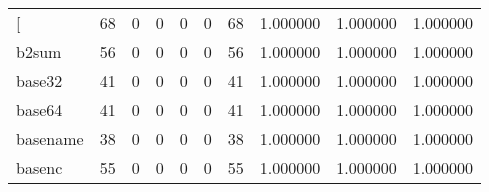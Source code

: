 \begin{longtable}{lrrrrrrrrr}
\bottomrule
\endlastfoot
{[}         &                                        68 &                                                  0 &                                                  0 &                                                  0 &                                                  0 &                                                 68 &                                           1.000000 &                               1.000000 &                             1.000000 \\
b2sum     &                                        56 &                                                  0 &                                                  0 &                                                  0 &                                                  0 &                                                 56 &                                           1.000000 &                               1.000000 &                             1.000000 \\
base32    &                                        41 &                                                  0 &                                                  0 &                                                  0 &                                                  0 &                                                 41 &                                           1.000000 &                               1.000000 &                             1.000000 \\
base64    &                                        41 &                                                  0 &                                                  0 &                                                  0 &                                                  0 &                                                 41 &                                           1.000000 &                               1.000000 &                             1.000000 \\
basename  &                                        38 &                                                  0 &                                                  0 &                                                  0 &                                                  0 &                                                 38 &                                           1.000000 &                               1.000000 &                             1.000000 \\
basenc    &                                        55 &                                                  0 &                                                  0 &                                                  0 &                                                  0 &                                                 55 &                                           1.000000 &                               1.000000 &                             1.000000 \\

\end{longtable}
